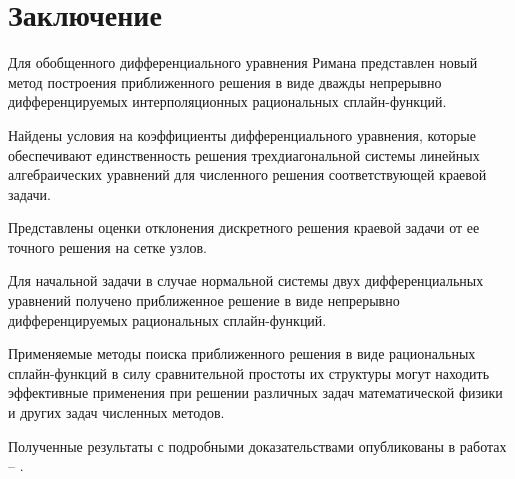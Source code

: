 \section{Заключение}

Для обобщенного дифференциального уравнения Римана представлен новый метод 
построения приближенного решения в виде дважды непрерывно
дифференцируемых интерполяционных рациональных сплайн-функций. 

Найдены условия на коэффициенты дифференциального уравнения, которые обеспечивают
единственность решения трехдиагональной системы линейных алгебраических уравнений
для численного решения соответствующей краевой задачи. 

Представлены оценки отклонения дискретного решения краевой задачи от ее точного 
решения на сетке узлов. 

Для начальной задачи в случае нормальной системы двух дифференциальных уравнений 
получено  приближенное решение в виде непрерывно дифференцируемых рациональных 
сплайн-функций. 

Применяемые методы поиска приближенного решения в виде рациональных сплайн-функций 
в силу сравнительной простоты их структуры могут находить эффективные применения
при решении различных задач математической физики и других задач численных методов.

Полученные результаты с подробными доказательствами опубликованы в работах
\cite {ark-19} -- \cite{ark-20}.


%

%

%

%

% 
%
% 
%






















